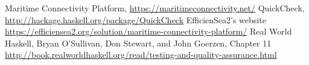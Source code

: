\begin{thebibliography}{1}
		Maritime Connectivity Platform,
		\url{https://maritimeconnectivity.net/}
		QuickCheck,
		\url{http://hackage.haskell.org/package/QuickCheck}
		EfficienSea2's website\\
		\url{https://efficiensea2.org/solution/maritime-connectivity-platform/}
		Real World Haskell,
		Bryan O'Sullivan, Don Stewart, and John Goerzen,
		Chapter 11\\
		\url{http://book.realworldhaskell.org/read/testing-and-quality-assurance.html}
\end{thebibliography}